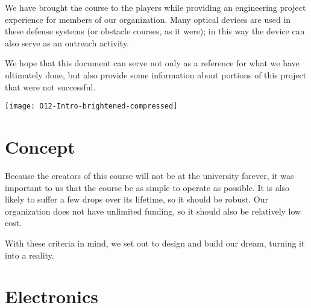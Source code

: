 \documentclass[11pt,oneside,final,letterpaper]{memoir}
\begin{document}
We have brought the course to the players while providing an engineering project experience for members of our organization.  Many optical devices are used in these defense systems (or obstacle courses, as it were); in this way the device can also serve as an outreach activity.

We hope that this document can serve not only as a reference for what we have ultimately done, but also provide some information about portions of this project that were not successful.

\vspace*{\fill}
\begin{center}
\texttt{[image: O12-Intro-brightened-compressed]}
\end{center}


\chapter*{Concept}

Because the creators of this course will not be at the university forever, it was important to us that the course be as simple to operate as possible.  It is also likely to suffer a few drops over its lifetime, so it should be robust.  Our organization does not have unlimited funding, so it should also be relatively low cost.

With these criteria in mind, we set out to design and build our dream, turning it into a reality.

\chapter*{Electronics}
\end{document}
